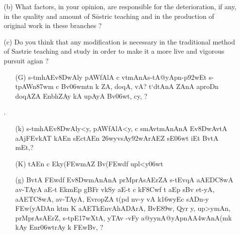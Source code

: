 {\begin{itemize}
\begin{itemize}
                 \item[(b)] What factors, in your opinion, are responsible for the deterioration, if any, in the quality and amount of S$\bar{a}$stric teaching and in the production of original work in these branches ?
                 
                 \item[(c)] Do you think that any modification is necessary in the traditional method of Sastrie teaching and study in order to make it a more live and vigorous pursuit agian ?
\end{itemize}
\end{itemize}
}
 
\begin{itemize} 
\item[]	 \begin{itemize}
       \item[({\dn G})] {\dn s\2-tmhAEv\38DwAly\? pAWfAlA c vt\0mAnA\break s\2-tA@yApn{\rs -\re}p\392wEt s\2-tpAWn\387wm\? c Bv\306wmt\?n k\? ZA, doqA, vA{\rs ?\re} t`dtAnA\2 ZAnA aproD\?n doqAZA\2 Enbh\0ZAy kA upAyA Bv\306wt, cy\?, {\rs ?\re} }
 
 \end{itemize}
 
 \item[{\dn \dnnum \rn{18}} .]\begin{itemize}
               
               \item[({\dn k})] {\dn s\2-tmhAEv\38DwAly\?<y, pAWfAlA<y, c smAvt\0\-mAnAnA\2 Ev\38DwAvtA aAjFEvkAT{\rdt} kAEn sEctAEn \326wyvsAy\392wArAEZ sE\306wt iEt BvtA\2 mEt,{\rs ?\re}}
               
               \item[({\dn K})] {\dn tAEn c Eky(\3FEwmAZ\2 Bv(\3FEwd\?f\? upl<y\306wt}
 
               \item[({\dn g})] {\dn BvtA\2 \3FEwd\?f\? Ev\38DwmAnAnA\2 prMprAsAErZA\2 s\2-t\-EvqA aAED\3C8wA av-TAyA aE-t EkmEp gBFr\2 v\4kSy aE-t c\? kF\38Cwf\2 t aEp s\2Bv\? et-yA, aAET\0\3C8wA, av-TAyA, EvropZA t(pd\? nv-y vA k\316wyEc sADn-y \3FEw(yADAn ktm\? K aAET\0kEnvA\0hADArA, BvE\389w, Qy\?r y\4, up>ymAn\4, prMprAsAErZ, s\2-tpE\317wXtA, yTAv{\rdt} -vFy a@yynA@yApnA\3A4wAnA(mk\2 kAy{\rdt} Enr\306wtrAy\2 k \3FEwBv\?, {\rs ?\re}} 
               

\end{itemize}
\end{itemize}
